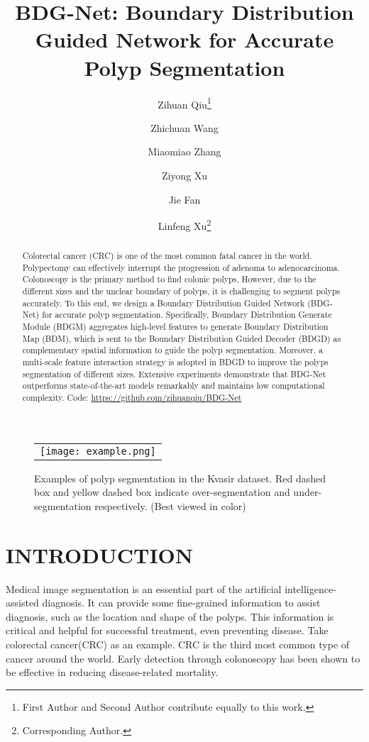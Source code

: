 \documentclass[]{spie}
\title{BDG-Net: Boundary Distribution Guided Network for Accurate Polyp Segmentation}
\author{Zihuan Qiu\thanks{First Author and Second Author contribute equally to this work.}}
\author{Zhichuan Wang}
\author{Miaomiao Zhang}
\author{Ziyong Xu}
\author{Jie Fan}
\author{Linfeng Xu\thanks{Corresponding Author.}}
\affil{
University of Electronic Science and Technology of China, Chengdu, China
\\
lfxu@uestc.edu.cn
}
\begin{document}
 
\maketitle

\begin{figure} [ht]
\begin{center}
\begin{tabular}{c} \texttt{[image: example.png]}
\end{tabular}
\end{center}
\caption[example]
{ \label{fig1} 
Examples of polyp segmentation in the Kvasir\cite{jha2020kvasir} dataset. Red dashed box and yellow dashed box indicate over-segmentation and under-segmentation respectively. (Best viewed in color)}
\end{figure} 

\begin{abstract}
Colorectal cancer (CRC) is one of the most common fatal cancer in the world. Polypectomy can effectively interrupt the progression of adenoma to adenocarcinoma. Colonoscopy is the primary method to find colonic polyps. However, due to the different sizes and the unclear boundary of polyps, it is challenging to segment polyps accurately. To this end, we design a Boundary Distribution Guided Network (BDG-Net) for accurate polyp segmentation. Specifically, Boundary Distribution Generate Module (BDGM) aggregates high-level features to generate Boundary Distribution Map (BDM), which is sent to the Boundary Distribution Guided Decoder (BDGD) as complementary spatial information to guide the polyp segmentation. Moreover, a multi-scale feature interaction strategy is adopted in BDGD to improve the polyps segmentation of different sizes. Extensive experiments demonstrate that BDG-Net outperforms state-of-the-art models remarkably and maintains low computational complexity. Code: \url{https://github.com/zihuanqiu/BDG-Net}
\end{abstract}


\section{INTRODUCTION}
\label{sec:intro}  

Medical image segmentation is an essential part of the artificial intelligence-assisted diagnosis. It can provide some fine-grained information to assist diagnosis, such as the location and shape of the polyps. This information is critical and helpful for successful treatment, even preventing disease. Take colorectal cancer(CRC) as an example. CRC is the third most common type of cancer around the world\cite{silva2014toward}. Early detection through colonoscopy has been shown to be effective in reducing disease-related mortality.
\end{document}
